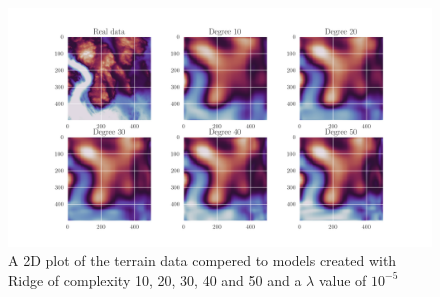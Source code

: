 %
\begin{figure}[H]
	\centering
	\includegraphics[width=\linewidth]{images/Figure_31.png}
	\caption{A 2D plot of the terrain data compered to models created with Ridge of complexity 10, 20, 30, 40 and 50 and a $\lambda$ value of $10^{-5}$}
	\label{Ridge 2D figure terrain data}
\end{figure}
